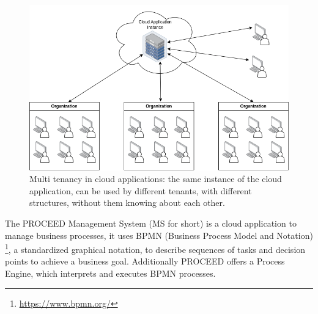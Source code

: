 \begin{figure}[H]
	\centering
	\includegraphics[scale=0.45]{images/mt-cloud-services.png}
	\caption{Multi tenancy in cloud applications: the same instance of the cloud
		application, can be used by different tenants, with different structures, without them knowing about each other.}
	\vspace{-1em} %
	\label{fig:multi-tenant=cloud-applications}
	\vspace{-1em} %
\end{figure}

The PROCEED Management System (MS for short)
is a cloud application to manage business processes,
it uses BPMN (Business Process Model and Notation) \footnote{\url{https://www.bpmn.org/}},
a standardized graphical notation,
to describe sequences of tasks and decision points to achieve a business goal.
Additionally PROCEED offers a Process Engine, which interprets and executes BPMN processes.


